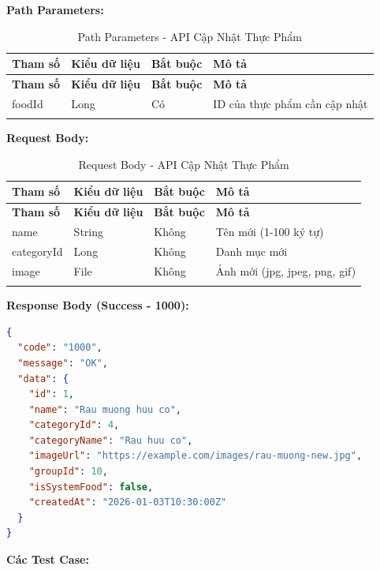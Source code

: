 \textbf{Path Parameters:}

\small
\begin{longtable}{|>{\raggedright\arraybackslash}p{3.5cm}|>{\raggedright\arraybackslash}p{2.5cm}|>{\raggedright\arraybackslash}p{2cm}|>{\raggedright\arraybackslash}p{5.5cm}|}
\hline
\textbf{Tham số} & \textbf{Kiểu dữ liệu} & \textbf{Bắt buộc} & \textbf{Mô tả} \\
\hline
\endfirsthead
\hline
\textbf{Tham số} & \textbf{Kiểu dữ liệu} & \textbf{Bắt buộc} & \textbf{Mô tả} \\
\hline
\endhead
foodId & Long & Có & ID của thực phẩm cần cập nhật \\
\hline
\caption{Path Parameters - API Cập Nhật Thực Phẩm}
\end{longtable}

\textbf{Request Body:}

\small
\begin{longtable}{|>{\raggedright\arraybackslash}p{3.5cm}|>{\raggedright\arraybackslash}p{2.5cm}|>{\raggedright\arraybackslash}p{2cm}|>{\raggedright\arraybackslash}p{5.5cm}|}
\hline
\textbf{Tham số} & \textbf{Kiểu dữ liệu} & \textbf{Bắt buộc} & \textbf{Mô tả} \\
\hline
\endfirsthead
\hline
\textbf{Tham số} & \textbf{Kiểu dữ liệu} & \textbf{Bắt buộc} & \textbf{Mô tả} \\
\hline
\endhead
name & String & Không & Tên mới (1-100 ký tự) \\
\hline
categoryId & Long & Không & Danh mục mới \\
\hline
image & File & Không & Ảnh mới (jpg, jpeg, png, gif) \\
\hline
\caption{Request Body - API Cập Nhật Thực Phẩm}
\end{longtable}

\textbf{Response Body (Success - 1000):}

\begin{lstlisting}[language=json, caption=Response thanh cong API 5.4]
{
  "code": "1000",
  "message": "OK",
  "data": {
    "id": 1,
    "name": "Rau muong huu co",
    "categoryId": 4,
    "categoryName": "Rau huu co",
    "imageUrl": "https://example.com/images/rau-muong-new.jpg",
    "groupId": 10,
    "isSystemFood": false,
    "createdAt": "2026-01-03T10:30:00Z"
  }
}
\end{lstlisting}

\textbf{Các Test Case:}

